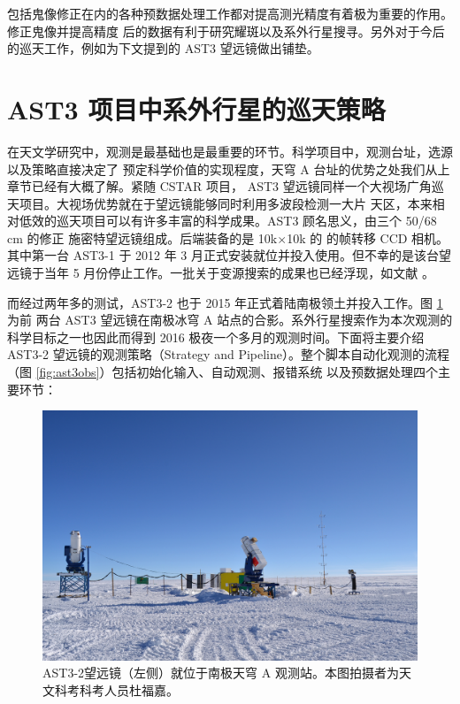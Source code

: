 包括鬼像修正在内的各种预数据处理工作都对提高测光精度有着极为重要的作用。修正鬼像并提高精度
后的数据有利于研究耀斑以及系外行星搜寻\cite{Liang2016,Wang2014CSTAR}。另外对于今后的巡天工作，例如为下文提到的 AST3 望远镜做出铺垫\cite{Cui2008}。


\section{AST3 项目中系外行星的巡天策略} \label{sec:ast3}

在天文学研究中，观测是最基础也是最重要的环节。科学项目中，观测台址，选源以及策略直接决定了
预定科学价值的实现程度，天穹 A 台址的优势之处我们从上章节已经有大概了解。紧随 CSTAR 项目，
AST3 望远镜同样一个大视场广角巡天项目。大视场优势就在于望远镜能够同时利用多波段检测一大片
天区，本来相对低效的巡天项目可以有许多丰富的科学成果。AST3 顾名思义，由三个 50/68 cm 的修正
施密特望远镜组成。后端装备的是 10k$\times$10k 的 的帧转移 CCD 相机。其中第一台 AST3-1 于 2012 年 3 月正式安装就位并投入使用。但不幸的是该台望远镜于当年 5 月份停止工作。一批关于变源搜索的成果也已经浮现，如文献 \cite{Li2015,Wang2017}。

而经过两年多的测试，AST3-2 也于 2015 年正式着陆南极领土并投入工作。图 \ref{fig:ast3tele} 为前
两台 AST3 望远镜在南极冰穹 A 站点的合影。系外行星搜索作为本次观测的科学目标之一也因此而得到 
2016 极夜一个多月的观测时间。下面将主要介绍 AST3-2 望远镜的观测策略（Strategy and 
Pipeline）。整个脚本自动化观测的流程（图 \ref{fig:ast3obs}）包括初始化输入、自动观测、报错系统
以及预数据处理四个主要环节：


\begin{figure}[t]
\centering
\includegraphics[width=1.0\textwidth]{figures/chapter2/f11_ast3.jpg}
\caption{AST3-2望远镜（左侧）就位于南极天穹 A 观测站。本图拍摄者为天文科考科考人员杜福嘉。}
\label{fig:ast3tele}
\end{figure}

